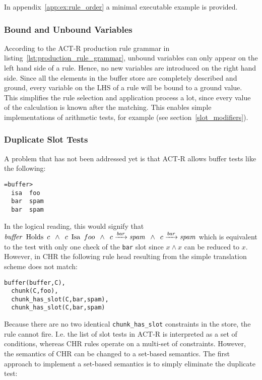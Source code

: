 In appendix~\ref{app:ex:rule_order} a minimal executable example is provided.

\subsubsection{Bound and Unbound Variables}
\label{bound_and_unbound_variables}

According to the ACT-R production rule grammar in listing~\ref{lst:production_rule_grammar}, unbound variables can only appear on the left hand side of a rule. Hence, no new variables are introduced on the right hand side. Since all the elements in the buffer store are completely described and ground, every variable on the LHS of a rule will be bound to a ground value. This simplifies the rule selection and application process a lot, since every value of the calculation is known after the matching. This enables simple implementations of arithmetic tests, for example (see section~\ref{slot_modifiers}).

\subsubsection{Duplicate Slot Tests}
\label{implementation:duplicate_slot_tests}

A problem that has not been addressed yet is that ACT-R allows buffer tests like the following:

\begin{lstlisting}
=buffer>
  isa  foo
  bar  spam
  bar  spam
\end{lstlisting}

In the logical reading, this would signify that $\mathord{\mathit{buffer}} \enspace \mathord{\mathrm{Holds}} \enspace c \enspace \wedge \enspace c \enspace \mathord{\mathrm{Isa}} \enspace foo \enspace \wedge \enspace c \xrightarrow{\mathord{\mathit{bar}}} \mathord{\mathit{spam}} \enspace \wedge \enspace c \xrightarrow{\mathord{\mathit{bar}}} \mathord{\mathit{spam}}$ which is equivalent to the test with only one check of the \lstinline|bar| slot since $x \wedge x$ can be reduced to $x$. However, in CHR the following rule head resulting from the simple translation scheme does not match:

\begin{lstlisting}
buffer(buffer,C),
  chunk(C,foo),
  chunk_has_slot(C,bar,spam),
  chunk_has_slot(C,bar,spam)
\end{lstlisting}

Because there are no two identical \lstinline|chunk_has_slot| constraints in the store, the rule cannot fire. I.e. the list of slot tests in ACT-R is interpreted as a set of conditions, whereas CHR rules operate on a multi-set of constraints. However, the semantics of CHR can be changed to a set-based semantics. The first approach to implement a set-based semantics is to simply eliminate the duplicate test:


